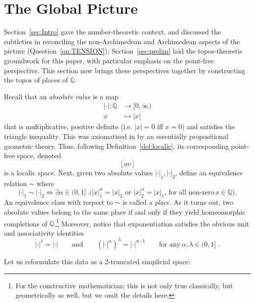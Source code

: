 \documentclass[a4paper, 11pt,reqno]{amsart}
\newcommand{\Q}{\mathbb{Q}}
\begin{document}
\section{The Global Picture}\label{sec:global-places} 

Section~\ref{sec:Intro} gave the number-theoretic context, and discussed the subtleties in reconciling the non-Archimedean and Archimedean aspects of the picture (Question~\ref{qn:TENSION}); Section~\ref{sec:prelim} laid the topos-theoretic groundwork for this paper, with particular emphasis on the point-free perspective. This section now brings these perspectives together by constructing the topos of places of $\Q$. 

\smallskip

Recall that an {\em absolute value} is a map
\begin{align}
|\cdot|\colon\mathbb{Q}&\longrightarrow [0,\infty)\\
x&\longmapsto |x| \nonumber 
\end{align}
that is multiplicative, positive definite (i.e. $|x|=0$ iff $x=0$) and satisfies the triangle inequality. This was axiomatised in \cite[\S 2]{NVOstrowski} by an essentially propositional geometric theory. Thus, following Definition~\ref{def:localic}, its corresponding point-free space, denoted $$[av]$$ 
is a localic space. Next, given two absolute values $|\cdot|_1,|\cdot|_2$, define an equivalence relation $\sim$ where 
\begin{equation}\label{eq:place-1}
|\cdot|_1\sim|\cdot|_2 \iff \exists \alpha\in(0,1]\,.\bigg( |x|^{\alpha}_1=|x|_2 \,\,\text{or}\,\, |x|^{\alpha}_2=|x|_1, \,\text{for all non-zero}\, x\in\mathbb{Q} \bigg). 
\end{equation}
An equivalence class with respect to $\sim$ is called a \textit{place}. As it turns out, two absolute values belong to the same place if and only if they yield homeomorphic completions of $\Q$.\footnote{For the constructive mathematician: this is not only true classically, but geometrically as well, but we omit the details here.} Moreover, notice that exponentiation satisfies the obvious unit and associativity identities
\begin{equation}\label{eq:place-2}
|\cdot|^1=|\cdot|\qquad\text{and}\qquad (|\cdot|^\alpha)^\lambda = |\cdot|^{\alpha\cdot\lambda}\qquad\text{for any}\,\alpha,\lambda\in (0,1]\,\,.
\end{equation}

Let us reformulate this data as a 2-truncated simplicial space:
\end{document}
